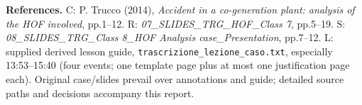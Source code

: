 \documentclass[10pt,a4paper]{article}
\begin{document}
\textbf{References.} C: P. Trucco (2014), \emph{Accident in a co-generation plant: analysis of the HOF involved}, pp.1--12. R: \emph{07\_SLIDES\_TRG\_HOF\_Class 7}, pp.5--19. S: \emph{08\_SLIDES\_TRG\_Class 8\_HOF Analysis case\_Presentation}, pp.7--12. L: supplied derived lesson guide, \texttt{trascrizione\_lezione\_caso.txt}, especially 13:53--15:40 (four events; one template page plus at most one justification page each). Original case/slides prevail over annotations and guide; detailed source paths and decisions accompany this report.
\end{document}
